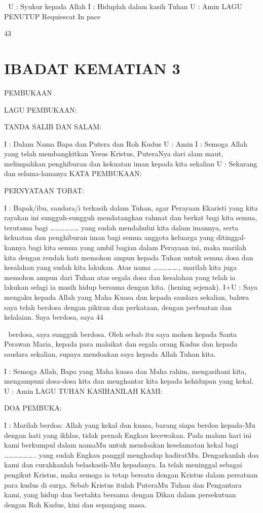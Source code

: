 \documentclass[10pt,a5paper,fancyhdr]{memoir}
\begin{document}

U : Syukur kepada Allah 
I : Hiduplah dalam kasih Tuhan 
U : Amin 
LAGU PENUTUP 
Requiescat In pace 

43 




\chapter{IBADAT KEMATIAN 3} 

PEMBUKAAN 

LAGU PEMBUKAAN: 

TANDA SALIB DAN SALAM: 

I : Dalam Nama Bapa dan Putera dan Roh Kudus 
U : Amin 
I : Semoga Allah yang telah membangkitkan Yesus Kristus, 
PuteraNya dari alam maut, melimpahkan penghiburan dan kekuatan 
iman kepada kita sekalian 
U : Sekarang dan selama-lamanya 
KATA PEMBUKAAN: 

PERNYATAAN TOBAT: 

I : Bapak/ibu, saudara/i terkasih dalam Tuhan, agar Perayaan Ekaristi 
yang kita rayakan ini sungguh-sungguh mendatangkan rahmat dan 
berkat bagi kita semua, terutama bagi ……………… yang sudah 
mendahului kita dalam imannya, serta kekuatan dan penghiburan 
iman bagi semua anggota keluarga yang ditinggal-kannya bagi kita 
semua yang ambil bagian dalam Perayaan ini, maka marilah kita 
dengan rendah hati memohon ampun kepada Tuhan untuk semua 
dosa dan kesalahan yang sudah kita lakukan. Atas nama 
……………., marilah kita juga memohon ampun dari Tuhan atas 
segala dosa dan kesalahan yang telah ia lakukan selagi ia masih hidup 
bersama dengan kita. 
(hening sejenak). 
I+U : Saya mengaku kepada Allah yang Maha Kuasa dan kepada 
saudara sekalian, bahwa saya telah berdosa dengan pikiran dan 
perkataan, dengan perbuatan dan kelalaian. Saya berdosa, saya 
44 



berdosa, saya sungguh berdosa. Oleh sebab itu saya mohon kepada 
Santa Perawan Maria, kepada para malaikat dan segala orang Kudus 
dan kepada saudara sekalian, supaya mendoakan saya kepada Allah 
Tuhan kita. 

I : Semoga Allah, Bapa yang Maha kuasa dan Maha rahim, 
mengasihani kita, mengampuni dosa-dosa kita dan menghantar kita 
kepada kehidupan yang kekal. 
U : Amin 
LAGU TUHAN KASIHANILAH KAMI: 

DOA PEMBUKA: 

I : Marilah berdoa: 
Allah yang kekal dan kuasa, barang siapa berdoa kepada-Mu 
dengan hati yang ikhlas, tidak pernah Engkau kecewakan. Pada 
malam hari ini kami berkumpul dalam namaMu untuk mendoakan 
keselamatan kekal bagi ……………….. yang sudah Engkau panggil 
menghadap hadiratMu. Dengarkanlah doa kami dan curahkanlah 
belaskasih-Mu kepadanya. Ia telah meninggal sebagai pengikut 
Kristus, maka semoga ia tetap bersatu dengan Kristus dalam 
persatuan para kudus di surga. Sebab Kristus itulah PuteraMu Tuhan 
dan Pengantara kami, yang hidup dan bertahta bersama dengan Dikau 
dalam persekutuan dengan Roh Kudus, kini dan sepanjang masa. 
\end{document}
